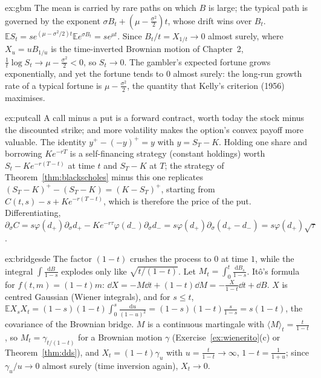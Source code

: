 \begin{solution}{ex:gbm}
\idea The mean is carried by rare paths on which $B$ is large; the typical path is governed by the exponent $\sigma B_t+(\mu-\frac{\sigma^2}2)t$, whose drift wins over $B_t$.
\writeup $\mathbb ES_t=se^{(\mu-\sigma^2/2)t}\mathbb Ee^{\sigma B_t}=se^{\mu t}$. Since $B_t/t=X_{1/t}\to0$ almost surely, where $X_u=uB_{1/u}$ is the time-inverted Brownian motion of Chapter~2,
$\frac1t\log S_t\to\mu-\frac{\sigma^2}2<0$, so $S_t\to0$. The gambler's expected fortune grows exponentially, and yet the fortune tends to $0$ almost surely: the long-run growth rate of a typical fortune is
$\mu-\frac{\sigma^2}2$, the quantity that Kelly's criterion (1956) maximises.
\end{solution}

\begin{solution}{ex:putcall}
\idea A call minus a put is a forward contract, worth today the stock minus the discounted strike; and more volatility makes the option's convex payoff more valuable.
\writeup The identity $y^+-(-y)^+=y$ with $y=S_T-K$. Holding one share and borrowing $Ke^{-rT}$ is a self-financing strategy (constant holdings) worth $S_t-Ke^{-r(T-t)}$ at time $t$ and $S_T-K$ at $T$; the strategy of
Theorem~\ref{thm:blackscholes} minus this one replicates $(S_T-K)^+-(S_T-K)=(K-S_T)^+$, starting from $C(t,s)-s+Ke^{-r(T-t)}$, which is therefore the price of the put. Differentiating, $\partial_\sigma C=s\varphi(d_+)\partial_\sigma d_+-Ke^{-r\tau}\varphi(d_-)\partial_\sigma d_-
=s\varphi(d_+)\partial_\sigma(d_+-d_-)=s\varphi(d_+)\sqrt\tau$.
\end{solution}

\begin{solution}{ex:bridgesde}
\idea The factor $(1-t)$ crushes the process to $0$ at time $1$, while the integral $\int\frac{\mathrm dB}{1-s}$ explodes only like $\sqrt{t/(1-t)}$.
\writeup Let $M_t=\int_0^t\frac{\mathrm dB_s}{1-s}$. It\^o's formula for $f(t,m)=(1-t)m$: $\dd X=-M\dd t+(1-t)\dd M=-\frac X{1-t}\dd t+\dd B$. $X$ is centred Gaussian (Wiener integrals), and for $s\le t$,
$\mathbb EX_sX_t=(1-s)(1-t)\int_0^s\frac{\mathrm du}{(1-u)^2}=(1-s)(1-t)\frac s{1-s}=s(1-t)$, the covariance of the Brownian bridge. $M$ is a continuous martingale with $\langle M\rangle_t=\frac t{1-t}$, so
$M_t=\gamma_{t/(1-t)}$ for a Brownian motion $\gamma$ (Exercise~\ref{ex:wienerito}(c) or Theorem~\ref{thm:dds}), and $X_t=(1-t)\gamma_{u}$ with $u=\frac t{1-t}\to\infty$, $1-t=\frac1{1+u}$; since $\gamma_u/u\to0$
almost surely (time inversion again), $X_t\to0$.
\end{solution}

